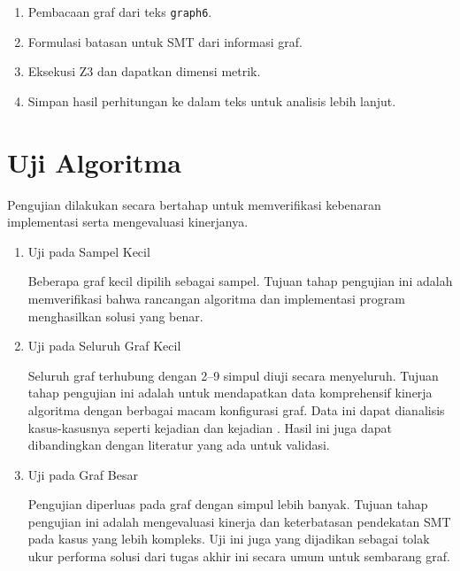 \begin{enumerate}

		\item Pembacaan graf dari  teks \verb`graph6`.

		\item Formulasi batasan untuk SMT dari informasi graf.

		\item Eksekusi Z3  dan dapatkan dimensi metrik.

		\item Simpan hasil perhitungan ke dalam  teks untuk analisis lebih lanjut.

\end{enumerate}

\section{Uji Algoritma}

Pengujian dilakukan secara bertahap untuk memverifikasi kebenaran implementasi serta mengevaluasi kinerjanya.

\begin{enumerate}

	\item{Uji pada Sampel Kecil}

	Beberapa graf kecil dipilih sebagai sampel. Tujuan tahap pengujian ini adalah memverifikasi bahwa rancangan algoritma dan implementasi program menghasilkan solusi yang benar.

	\item{Uji pada Seluruh Graf Kecil}

	Seluruh graf terhubung dengan 2–9 simpul diuji secara menyeluruh. Tujuan tahap pengujian ini adalah untuk mendapatkan data komprehensif kinerja algoritma dengan berbagai macam konfigurasi graf. Data ini dapat dianalisis kasus-kasusnya seperti kejadian  dan kejadian . Hasil ini juga dapat dibandingkan dengan literatur yang ada untuk validasi.

	\item{Uji pada Graf Besar}

	Pengujian diperluas pada graf dengan simpul lebih banyak. Tujuan tahap pengujian ini adalah mengevaluasi kinerja dan keterbatasan pendekatan SMT pada kasus yang lebih kompleks. Uji ini juga yang dijadikan sebagai tolak ukur performa solusi dari tugas akhir ini secara umum untuk sembarang graf.

\end{enumerate}

